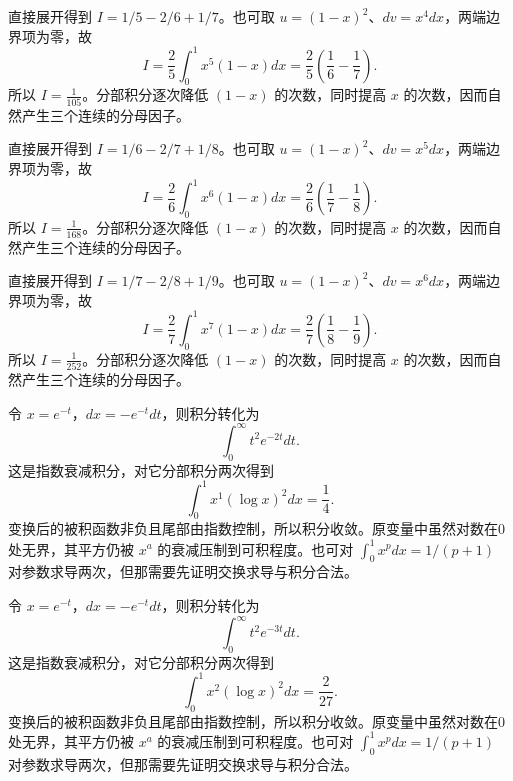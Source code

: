 \documentclass[UTF8,12pt,a4paper,fontset=fandol]{ctexart}
\begin{document}
\begin{solve}\label{ans:c20q4}
直接展开得到 $I=1/5-2/6+1/7$。也可取 $u=(1-x)^2$、$dv=x^{4}dx$，两端边界项为零，故
\[
I=\frac2{5}\int_0^1x^{5}(1-x)dx=\frac2{5}\left(\frac1{6}-\frac1{7}\right).
\]
所以 $I=\frac{1}{105}$。分部积分逐次降低 $(1-x)$ 的次数，同时提高 $x$ 的次数，因而自然产生三个连续的分母因子。
\end{solve}

\begin{solve}\label{ans:c20q5}
直接展开得到 $I=1/6-2/7+1/8$。也可取 $u=(1-x)^2$、$dv=x^{5}dx$，两端边界项为零，故
\[
I=\frac2{6}\int_0^1x^{6}(1-x)dx=\frac2{6}\left(\frac1{7}-\frac1{8}\right).
\]
所以 $I=\frac{1}{168}$。分部积分逐次降低 $(1-x)$ 的次数，同时提高 $x$ 的次数，因而自然产生三个连续的分母因子。
\end{solve}

\begin{solve}\label{ans:c20q6}
直接展开得到 $I=1/7-2/8+1/9$。也可取 $u=(1-x)^2$、$dv=x^{6}dx$，两端边界项为零，故
\[
I=\frac2{7}\int_0^1x^{7}(1-x)dx=\frac2{7}\left(\frac1{8}-\frac1{9}\right).
\]
所以 $I=\frac{1}{252}$。分部积分逐次降低 $(1-x)$ 的次数，同时提高 $x$ 的次数，因而自然产生三个连续的分母因子。
\end{solve}

\begin{solve}\label{ans:c20q7}
令 $x=e^{-t}$，$dx=-e^{-t}dt$，则积分转化为
\[
\int_0^\infty t^2e^{-2t}dt.
\]
这是指数衰减积分，对它分部积分两次得到
\[
\int_0^1x^{1}(\log x)^2dx=\frac{1}{4}.
\]
变换后的被积函数非负且尾部由指数控制，所以积分收敛。原变量中虽然对数在0处无界，其平方仍被 $x^a$ 的衰减压制到可积程度。也可对 $\int_0^1x^pdx=1/(p+1)$ 对参数求导两次，但那需要先证明交换求导与积分合法。
\end{solve}

\begin{solve}\label{ans:c20q8}
令 $x=e^{-t}$，$dx=-e^{-t}dt$，则积分转化为
\[
\int_0^\infty t^2e^{-3t}dt.
\]
这是指数衰减积分，对它分部积分两次得到
\[
\int_0^1x^{2}(\log x)^2dx=\frac{2}{27}.
\]
变换后的被积函数非负且尾部由指数控制，所以积分收敛。原变量中虽然对数在0处无界，其平方仍被 $x^a$ 的衰减压制到可积程度。也可对 $\int_0^1x^pdx=1/(p+1)$ 对参数求导两次，但那需要先证明交换求导与积分合法。
\end{solve}
\end{document}
